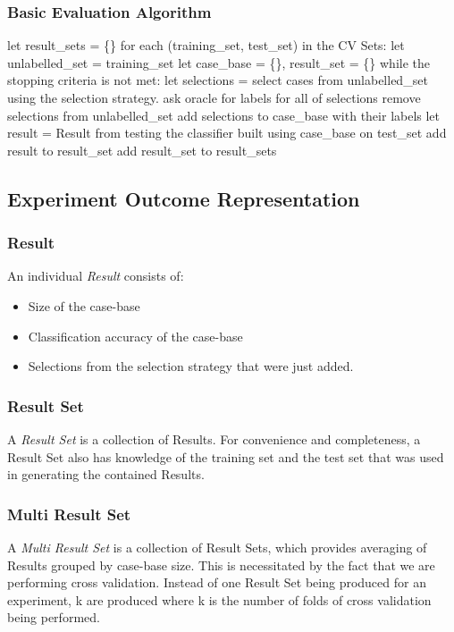 \documentclass[a4paper,11pt]{report}
\begin{document}
\subsubsection{Basic Evaluation Algorithm}
\nopagebreak[4]
\begin{code}
let result_sets = \{\}
for each (training_set, test_set) in the CV Sets:
  let unlabelled_set = training_set
  let case_base = \{\}, result_set = \{\}
  while the stopping criteria is not met:
    let selections = select cases from unlabelled_set using 
                     the selection strategy.
    ask oracle for labels for all of selections
    remove selections from unlabelled_set
    add selections to case_base with their labels
    let result = Result from testing the classifier
                 built using case_base on test_set
    add result to result_set
  add result_set to result_sets
\end{code}

\subsection{Experiment Outcome Representation}
\subsubsection{Result}
An individual \emph{Result} consists of:
\begin{itemize}
	\item Size of the case-base
	\item Classification accuracy of the case-base
	\item Selections from the selection strategy that were just added.
\end{itemize}

\subsubsection{Result Set}
A \emph{Result Set} is a collection of Results. For convenience and completeness, a Result Set also has knowledge of the training set and the test set that was used in generating the contained Results.

\subsubsection{Multi Result Set}
A \emph{Multi Result Set} is a collection of Result Sets, which provides averaging of Results grouped by case-base size. This is necessitated by the fact that we are performing cross validation. Instead of one Result Set being produced for an experiment, k are produced where k is the number of folds of cross validation being performed.
\end{document}
